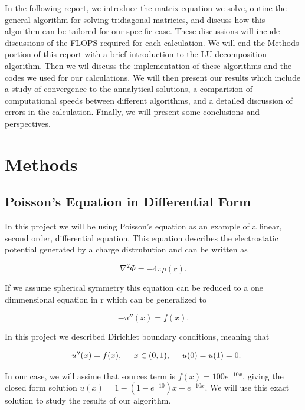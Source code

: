 \documentclass[%
oneside,                 %
final,                   %
10pt]{article}
\begin{document}
In the following report, we introduce the matrix equation we solve, outine the general algorithm for solving tridiagonal matricies, and discuss how this algorithm can be tailored for our specific case.  These discussions will incude discussions of the FLOPS required for each calculation.  We will end the Methods portion of this report with a brief introduction to the LU decomposition algorithm.  Then we wil discuss the implementation of these algorithms and the codes we used for our calculations.  We will then present our results which include a study of convergence to the annalytical solutions, a comparision of computational speeds between different algorithms, and a detailed discussion of errors in the calculation.   Finally, we will present some conclusions and perspectives. 

\section{Methods}

\subsection{Poisson's Equation in Differential Form}

In this project we will be using Poisson's equation as an example of a linear, second order, differential equation.  This equation describes the electrostatic potential generated by a charge distrubution and can be written as 

\begin{equation*}
\nabla^2 \Phi = -4\pi \rho (\mathbf{r}).
\end{equation*}

If we assume spherical symmetry this equation can be reduced to a one dimmensional equation in r which can be generalized to 

\begin{equation*}
-u''(x) = f(x).
\end{equation*}

In this project we described Dirichlet boundary conditions, meaning that 

\begin{equation*}
-u''(x) = f(x), \hspace{0.5cm} x\in(0,1), \hspace{0.5cm} u(0) = u(1) = 0.
\end{equation*}

In our case, we will assime that sources term is $f(x) = 100e^{-10x}$, giving the closed form solution  $u(x) = 1-(1-e^{-10})x-e^{-10x}$.  We will use this exact solution to study the results of our algorithm.
\end{document}
